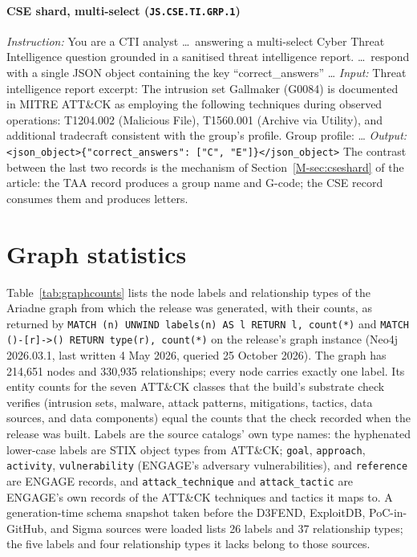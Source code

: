 \documentclass[11pt,a4paper]{article}
\begin{document}
\paragraph{CSE shard, multi-select (\texttt{JS.CSE.TI.GRP.1})}
\emph{Instruction:} You are a CTI analyst \ldots\ answering a multi-select Cyber Threat Intelligence question grounded in a sanitised threat intelligence report. \ldots\ respond with a single JSON object containing the key ``correct\_answers'' \ldots
\emph{Input:} Threat intelligence report excerpt: The intrusion set Gallmaker (G0084) is documented in MITRE ATT\&CK as employing the following techniques during observed operations: T1204.002 (Malicious File), T1560.001 (Archive via Utility), and additional tradecraft consistent with the group's profile. Group profile: \ldots
\emph{Output:} \texttt{<json\_object>\{"correct\_answers": ["C", "E"]\}</json\_object>}
The contrast between the last two records is the mechanism of Section~\ref{M-sec:cseshard} of the article: the TAA record produces a group name and G-code; the CSE record consumes them and produces letters.

\section{Graph statistics}\label{app:graph}
Table~\ref{tab:graphcounts} lists the node labels and relationship types of the Ariadne graph from which the release was generated, with their counts, as returned by \texttt{MATCH (n) UNWIND labels(n) AS l RETURN l, count(*)} and \texttt{MATCH ()-[r]->() RETURN type(r), count(*)} on the release's graph instance (Neo4j 2026.03.1, last written 4 May 2026, queried 25 October 2026). The graph has 214,651 nodes and 330,935 relationships; every node carries exactly one label. Its entity counts for the seven ATT\&CK classes that the build's substrate check verifies (intrusion sets, malware, attack patterns, mitigations, tactics, data sources, and data components) equal the counts that the check recorded when the release was built. Labels are the source catalogs' own type names: the hyphenated lower-case labels are STIX object types from ATT\&CK; \texttt{goal}, \texttt{approach}, \texttt{activity}, \texttt{vulnerability} (ENGAGE's adversary vulnerabilities), and \texttt{reference} are ENGAGE records, and \texttt{attack\_technique} and \texttt{attack\_tactic} are ENGAGE's own records of the ATT\&CK techniques and tactics it maps to. A generation-time schema snapshot taken before the D3FEND, ExploitDB, PoC-in-GitHub, and Sigma sources were loaded lists 26 labels and 37 relationship types; the five labels and four relationship types it lacks belong to those sources.
\end{document}
